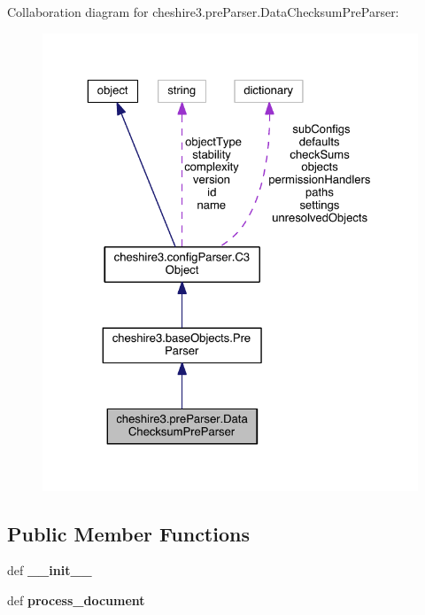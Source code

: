 Collaboration diagram for cheshire3.\-pre\-Parser.\-Data\-Checksum\-Pre\-Parser\-:
\nopagebreak
\begin{figure}[H]
\begin{center}
\leavevmode
\includegraphics[width=325pt]{classcheshire3_1_1pre_parser_1_1_data_checksum_pre_parser__coll__graph}
\end{center}
\end{figure}
\subsection*{Public Member Functions}
\begin{DoxyCompactItemize}
\item 
\hypertarget{classcheshire3_1_1pre_parser_1_1_data_checksum_pre_parser_aaf26128b1d5b18d414f5521a394c892d}{def {\bfseries \-\_\-\-\_\-init\-\_\-\-\_\-}}\label{classcheshire3_1_1pre_parser_1_1_data_checksum_pre_parser_aaf26128b1d5b18d414f5521a394c892d}

\item 
\hypertarget{classcheshire3_1_1pre_parser_1_1_data_checksum_pre_parser_add553deb9ee80e1840d0105903adf4d8}{def {\bfseries process\-\_\-document}}\label{classcheshire3_1_1pre_parser_1_1_data_checksum_pre_parser_add553deb9ee80e1840d0105903adf4d8}

\end{DoxyCompactItemize}
